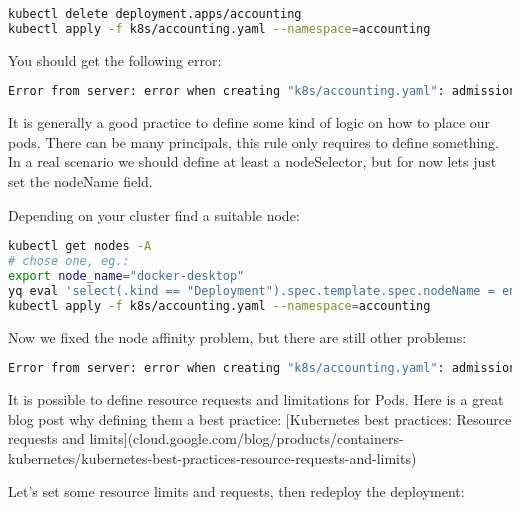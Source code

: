\begin{lstlisting}[caption={TODO},language=bash,label=code:bashx]
kubectl delete deployment.apps/accounting
kubectl apply -f k8s/accounting.yaml --namespace=accounting
\end{lstlisting}

You should get the following error:

\begin{lstlisting}[caption={TODO},language=bash,label=code:todo]
Error from server: error when creating "k8s/accounting.yaml": admission webhook "node-affinity.btieger.me" denied the request: Deployment must have some kind of node affinity! (affinity, nodeSelector, nodeName)
\end{lstlisting}

It is generally a good practice to define some kind of logic on how to place our pods. There can be many principals, this rule only requires to define something. In a real scenario we should define at least a nodeSelector, but for now lets just set the nodeName field.

Depending on your cluster find a suitable node:

\begin{lstlisting}[caption={Fix node affinity error},language=bash,label=code:bashx]
kubectl get nodes -A
# chose one, eg.:
export node_name="docker-desktop"
yq eval 'select(.kind == "Deployment").spec.template.spec.nodeName = env(node_name)' k8s/accounting.yaml -i
kubectl apply -f k8s/accounting.yaml --namespace=accounting
\end{lstlisting}

Now we fixed the node affinity problem, but there are still other problems:

\begin{lstlisting}[caption={TODO},language=bash,label=code:todo]
Error from server: error when creating "k8s/accounting.yaml": admission webhook "deny-no-resources.btieger.me" denied the request: Deployment must have resource definitions!
\end{lstlisting}

It is possible to define resource requests and limitations for Pods. Here is a great blog post why defining them a best practice: [Kubernetes best practices: Resource requests and limits](cloud.google.com/blog/products/containers-kubernetes/kubernetes-best-practices-resource-requests-and-limits)

Let's set some resource limits and requests, then redeploy the deployment:

